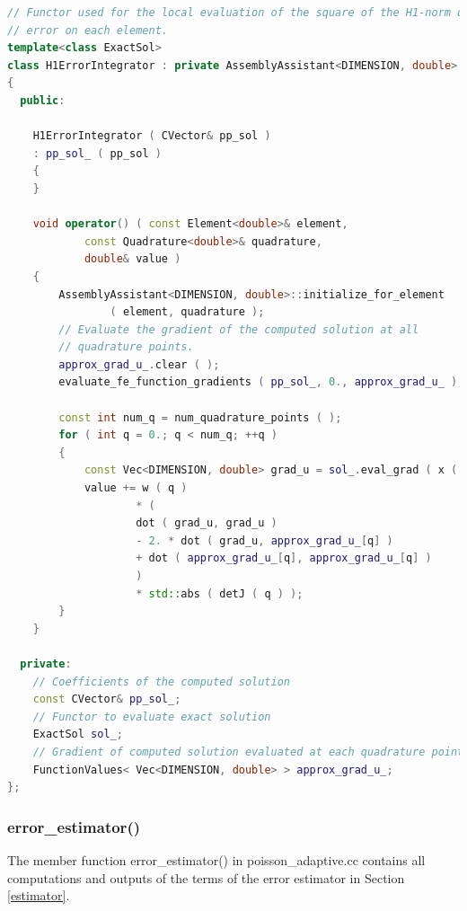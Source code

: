 \documentclass[a4paper, 11pt, twoside]{article}
\begin{document}
\begin{lstlisting}[language=C++, basicstyle={\footnotesize, \ttfamily}, keywordstyle=\color{blue}, numbers=none, tabsize=4]
// Functor used for the local evaluation of the square of the H1-norm of the
// error on each element.
template<class ExactSol>
class H1ErrorIntegrator : private AssemblyAssistant<DIMENSION, double>
{
  public:

    H1ErrorIntegrator ( CVector& pp_sol )
    : pp_sol_ ( pp_sol )
    {
    }

    void operator() ( const Element<double>& element,
            const Quadrature<double>& quadrature,
            double& value )
    {
        AssemblyAssistant<DIMENSION, double>::initialize_for_element
                ( element, quadrature );
        // Evaluate the gradient of the computed solution at all
        // quadrature points.
        approx_grad_u_.clear ( );
        evaluate_fe_function_gradients ( pp_sol_, 0., approx_grad_u_ );

        const int num_q = num_quadrature_points ( );
        for ( int q = 0.; q < num_q; ++q )
        {
            const Vec<DIMENSION, double> grad_u = sol_.eval_grad ( x ( q ) );
            value += w ( q )
                    * (
                    dot ( grad_u, grad_u )
                    - 2. * dot ( grad_u, approx_grad_u_[q] )
                    + dot ( approx_grad_u_[q], approx_grad_u_[q] )
                    )
                    * std::abs ( detJ ( q ) );
        }
    }

  private:
    // Coefficients of the computed solution
    const CVector& pp_sol_;
    // Functor to evaluate exact solution
    ExactSol sol_;
    // Gradient of computed solution evaluated at each quadrature point
    FunctionValues< Vec<DIMENSION, double> > approx_grad_u_;
};
\end{lstlisting}

\subsubsection{error\_estimator()}\label{sec:errorest}
The member function error\_estimator() in poisson\_adaptive.cc contains all computations and outputs of the terms of the error estimator in Section \ref{estimator}. 
\end{document}

